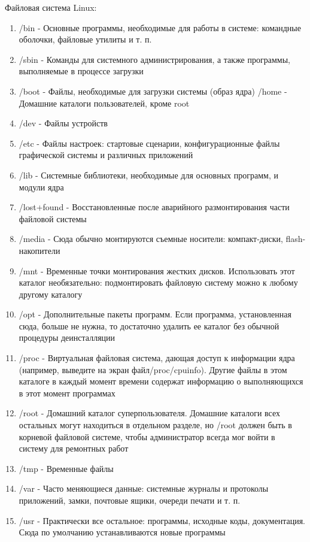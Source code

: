 Файловая система Linux:
\begin{enumerate}
    \item/bin - Основные программы, необходимые для работы в системе: командные оболочки, файловые утилиты и т. п. 
    \item/sbin - Команды для системного администрирования, а также программы, выполняемые в процессе загрузки 
    \item/boot - Файлы, необходимые для загрузки системы (образ ядра) 
/home - Домашние каталоги пользователей, кроме root 
    \item/dev - Файлы устройств 
    \item/etc - Файлы настроек: стартовые сценарии, конфигурационные файлы графической системы и различных приложений 
    \item/lib - Системные библиотеки, необходимые для основных программ, и модули ядра 
    \item/lost+found - Восстановленные после аварийного размонтирования части файловой системы
    \item/media - Сюда обычно монтируются съемные носители: компакт-диски, flash-накопители 
    \item/mnt - Временные точки монтирования жестких дисков. Использовать этот каталог необязательно: подмонтировать файловую систему можно к любому другому каталогу 
    \item/opt - Дополнительные пакеты программ. Если программа, установленная сюда, больше не нужна, то достаточно удалить ее каталог без обычной процедуры деинсталляции 
    \item/proc - Виртуальная файловая система, дающая доступ к информации ядра (например, выведите на экран файл/proc/cpuinfo). Другие файлы в этом каталоге в каждый момент времени содержат информацию о выполняющихся в этот момент программах 
    \item/root - Домашний каталог суперпользователя. Домашние каталоги всех остальных могут находиться в отдельном разделе, но /root должен быть в корневой файловой системе, чтобы администратор всегда мог войти в систему для ремонтных работ 
    \item/tmp - Временные файлы 
    \item/var - Часто меняющиеся данные: системные журналы и протоколы приложений, замки, почтовые ящики, очереди печати и т. п. 
    \item/usr - Практически все остальное: программы, исходные коды, документация. Сюда по умолчанию устанавливаются новые программы
\end{enumerate}

